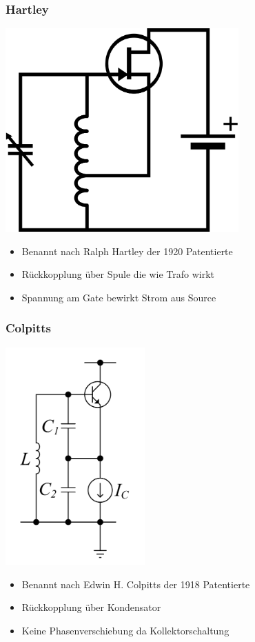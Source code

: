 \begin{frame}
    \frametitle{Hartley}
    \begin{center}
        \includegraphics[width=0.67\textwidth]{a07/Hartley_osc.png}
        \tiny \hyperlink{refs}{\cite{wm}} \\[1em] \large
     	\begin{itemize}
			\item Benannt nach Ralph Hartley der 1920 Patentierte
			\item Rückkopplung über Spule die wie Trafo wirkt
			\item Spannung am Gate bewirkt Strom aus Source 
    	\end{itemize}
    \end{center}
\end{frame}

\begin{frame}
    \frametitle{Colpitts}
        \begin{center}
        \includegraphics[width=0.4\textwidth]{a07/Cc_colp2.png} \\[1em] \large
     	\begin{itemize}
			\item Benannt nach Edwin H. Colpitts der 1918 Patentierte
			\item Rückkopplung über Kondensator
			\item Keine Phasenverschiebung da Kollektorschaltung
    	\end{itemize}
    \end{center}
\end{frame}

